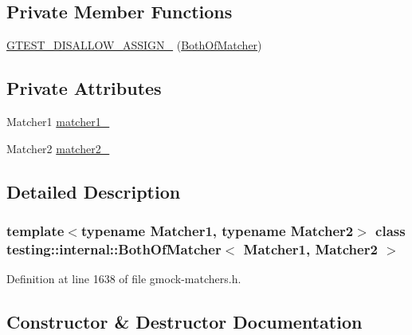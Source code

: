 \subsection*{Private Member Functions}
\begin{DoxyCompactItemize}
\item 
\hyperlink{classtesting_1_1internal_1_1BothOfMatcher_a8d1c93372fdecb93eb2413e29f8424f6}{G\+T\+E\+S\+T\+\_\+\+D\+I\+S\+A\+L\+L\+O\+W\+\_\+\+A\+S\+S\+I\+G\+N\+\_\+} (\hyperlink{classtesting_1_1internal_1_1BothOfMatcher}{Both\+Of\+Matcher})
\end{DoxyCompactItemize}
\subsection*{Private Attributes}
\begin{DoxyCompactItemize}
\item 
Matcher1 \hyperlink{classtesting_1_1internal_1_1BothOfMatcher_a7aeed14276f48d927300a3e2ab23f702}{matcher1\+\_\+}
\item 
Matcher2 \hyperlink{classtesting_1_1internal_1_1BothOfMatcher_a531d417ec0480876070ce9da6e0f71ae}{matcher2\+\_\+}
\end{DoxyCompactItemize}


\subsection{Detailed Description}
\subsubsection*{template$<$typename Matcher1, typename Matcher2$>$\newline
class testing\+::internal\+::\+Both\+Of\+Matcher$<$ Matcher1, Matcher2 $>$}



Definition at line 1638 of file gmock-\/matchers.\+h.



\subsection{Constructor \& Destructor Documentation}
\mbox{\label{classtesting_1_1internal_1_1BothOfMatcher_ab7941deda1965521f72d58b0dd429d6a}} 
